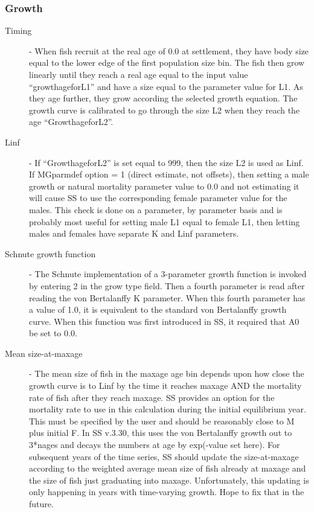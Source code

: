 \subsubsection{Growth}
\begin{description}
	\item [Timing] - When fish recruit at the real age of 0.0 at settlement, they have body size equal to the lower edge of the first population size bin.  The fish then grow linearly until they reach a real age equal to the input value “growth\textunderscore age\textunderscore for\textunderscore L1” and have a size equal to the parameter value for L1.  As they age further, they grow according the selected growth equation.  The growth curve is calibrated to go through the size L2 when they reach the age “Growth\textunderscore age\textunderscore for\textunderscore L2”.
	\item  [Linf] - If “Growth\textunderscore age\textunderscore for\textunderscore L2” is set equal to 999, then the size L2 is used as Linf.  If MGparm\textunderscore def option = 1 (direct estimate, not offsets), then setting a male growth or natural mortality parameter value to 0.0 and not estimating it will cause SS to use the corresponding female parameter value for the males. This check is done on a parameter, by parameter basis and is probably most useful for setting male L1 equal to female L1, then letting males and females have separate K and Linf parameters.
	\item[Schnute growth function] - The Schnute implementation of a 3-parameter growth function is invoked by entering 2 in the grow type field.  Then a fourth parameter is read after reading the von Bertalanffy K parameter.  When this fourth parameter has a value of 1.0, it is equivalent to the standard von Bertalanffy growth curve.  When this function was first introduced in SS, it required that A0 be set to 0.0.
	\item[Mean size-at-maxage] - The mean size of fish in the maxage age bin depends upon how close the growth curve is to Linf by the time it reaches maxage AND the mortality rate of fish after they reach maxage.  SS provides an option for the mortality rate to use in this calculation during the initial equilibrium year.  This must be specified by the user and should be reasonably close to M plus initial F.  In SS v.3.30, this uses the von Bertalanffy growth out to 3*nages and decays the numbers at age by exp(-value set here). For subsequent years of the time series, SS should update the size-at-maxage according to the weighted average mean size of fish already at maxage and the size of fish just graduating into maxage.  Unfortunately, this updating is only happening in years with time-varying growth.  Hope to fix that in the future.

\end{description}
